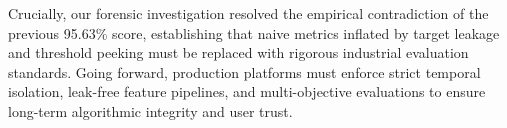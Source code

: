 \documentclass[11pt,a4paper]{article}
\begin{document}
Crucially, our forensic investigation resolved the empirical contradiction of the previous 95.63\% score, establishing that naive metrics inflated by target leakage and threshold peeking must be replaced with rigorous industrial evaluation standards. Going forward, production platforms must enforce strict temporal isolation, leak-free feature pipelines, and multi-objective evaluations to ensure long-term algorithmic integrity and user trust.
\end{document}
